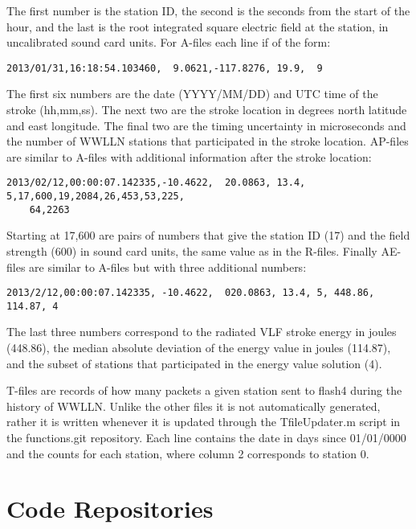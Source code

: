 The first number is the station ID, the second is the seconds from the start of the hour, and the last is the root integrated square electric field at the station, in uncalibrated sound card units.
For A-files each line if of the form:

\begin{verbatim}
2013/01/31,16:18:54.103460,  9.0621,-117.8276, 19.9,  9
\end{verbatim}

The first six numbers are the date (YYYY/MM/DD) and UTC time of the stroke (hh,mm,ss).
The next two are the stroke location in degrees north latitude and east longitude.
The final two are the timing uncertainty in microseconds and the number of WWLLN stations that participated in the stroke location.
AP-files are similar to A-files with additional information after the stroke location:

\begin{verbatim}
2013/02/12,00:00:07.142335,-10.4622,  20.0863, 13.4,  5,17,600,19,2084,26,453,53,225,
	64,2263
\end{verbatim}

Starting at 17,600 are pairs of numbers that give the station ID (17) and the field strength (600) in sound card units, the same value as in the R-files. Finally AE-files are similar to A-files but with three additional numbers:

\begin{verbatim}
2013/2/12,00:00:07.142335, -10.4622,  020.0863, 13.4, 5, 448.86, 114.87, 4
\end{verbatim}

The last three numbers correspond to the radiated VLF stroke energy in joules (448.86), the median absolute deviation of the energy value in joules (114.87), and the subset of stations that participated in the energy value solution (4).

T-files are records of how many packets a given station sent to flash4 during the history of WWLLN.
Unlike the other files it is not automatically generated, rather it is written whenever it is updated through the TfileUpdater.m script in the functions.git repository.
Each line contains the date in days since 01/01/0000 and the counts for each station, where column 2 corresponds to station 0.

\section{Code Repositories}

